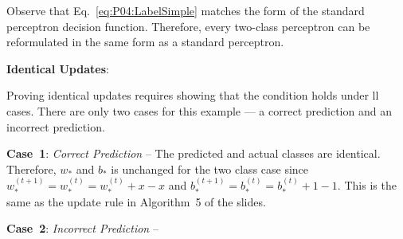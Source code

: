 Observe that Eq.~\eqref{eq:P04:LabelSimple} matches the form of the standard perceptron decision function.  Therefore, every two-class perceptron can be reformulated in the same form as a standard perceptron.

\noindent
{\Large \textbf{Identical Updates}:}

Proving identical updates requires showing that the condition holds under ll cases.  There are only two cases for this example --- a correct prediction and an incorrect prediction.

\noindent
\textbf{Case~1}: \textit{Correct Prediction} -- The predicted and actual classes are identical.  Therefore, $w_{*}$ and $b_{*}$ is unchanged for the two class case since $w_{*}^{(t+1)} = w^{(t)}_{*} = w^{(t)}_{*} + x -x$ and $b^{(t+1)}_{*} = b^{(t)}_{*} = b^{(t)}_{*} + 1 - 1$. This is the same as the update rule in Algorithm~5 of the slides.

\noindent
\textbf{Case~2}: \textit{Incorrect Prediction} --
